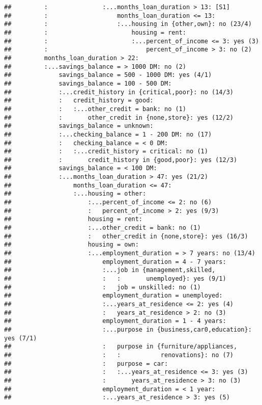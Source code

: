 \documentclass[
]{article}
\begin{document}
\begin{verbatim}
##         :               :...months_loan_duration > 13: [S1]
##         :                   months_loan_duration <= 13:
##         :                   :...housing in {other,own}: no (23/4)
##         :                       housing = rent:
##         :                       :...percent_of_income <= 3: yes (3)
##         :                           percent_of_income > 3: no (2)
##         months_loan_duration > 22:
##         :...savings_balance = > 1000 DM: no (2)
##             savings_balance = 500 - 1000 DM: yes (4/1)
##             savings_balance = 100 - 500 DM:
##             :...credit_history in {critical,poor}: no (14/3)
##             :   credit_history = good:
##             :   :...other_credit = bank: no (1)
##             :       other_credit in {none,store}: yes (12/2)
##             savings_balance = unknown:
##             :...checking_balance = 1 - 200 DM: no (17)
##             :   checking_balance = < 0 DM:
##             :   :...credit_history = critical: no (1)
##             :       credit_history in {good,poor}: yes (12/3)
##             savings_balance = < 100 DM:
##             :...months_loan_duration > 47: yes (21/2)
##                 months_loan_duration <= 47:
##                 :...housing = other:
##                     :...percent_of_income <= 2: no (6)
##                     :   percent_of_income > 2: yes (9/3)
##                     housing = rent:
##                     :...other_credit = bank: no (1)
##                     :   other_credit in {none,store}: yes (16/3)
##                     housing = own:
##                     :...employment_duration = > 7 years: no (13/4)
##                         employment_duration = 4 - 7 years:
##                         :...job in {management,skilled,
##                         :   :       unemployed}: yes (9/1)
##                         :   job = unskilled: no (1)
##                         employment_duration = unemployed:
##                         :...years_at_residence <= 2: yes (4)
##                         :   years_at_residence > 2: no (3)
##                         employment_duration = 1 - 4 years:
##                         :...purpose in {business,car0,education}: yes (7/1)
##                         :   purpose in {furniture/appliances,
##                         :   :           renovations}: no (7)
##                         :   purpose = car:
##                         :   :...years_at_residence <= 3: yes (3)
##                         :       years_at_residence > 3: no (3)
##                         employment_duration = < 1 year:
##                         :...years_at_residence > 3: yes (5)

\end{verbatim}
\end{document}
